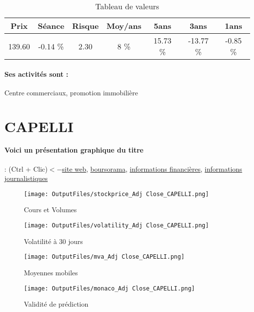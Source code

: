 \documentclass[11pt,a4paper]{report}%
\begin{document}
\begin{table}[H]
  \centering
    \begin{tabular}{|c|c|c|c|c|c|c|}
    \hline
    Prix & Séance & Risque  & Moy/ans & 5ans & 3ans & 1ans \\
    \hline
    139.60 &    -0.14 \%    & 2.30 & 8 \% & 15.73 \% & -13.77 \% & -0.85 \% \\
    \hline
    \end{tabular}%
        \label{tab:table_ALTAREA}%
      \caption{Tableau de valeurs}
\end{table}%

\paragraph{Ses activités sont : } Centre commerciaux, promotion immobilière 
    
    \newpage

\section{CAPELLI}

\paragraph{Voici un présentation graphique du titre} : (Ctrl + Clic)$<-$\href{https://capelli-immobilier.fr/information-financiere}{site web}, \href{https://www.boursorama.com/cours/1rPCAPLI}{boursorama}, \href{https://www.qwant.com/?q=site:https:%2f%2fwww.easybourse.com%2faction-societe%2fCAPELLI&t=web&client=ext-firefox-hp}{informations financières}, \href{https://bourse.lerevenu.com/cours-de-bourse/fiche-valeur-synthese/CAPELLI/CAPLI-FR}{informations journalistiques}
\begin{figure}[!htb]
   \begin{minipage}{0.5\textwidth}
     \centering
     \texttt{[image: OutputFiles/stockprice\_Adj Close\_CAPELLI.png]}
     \caption{Cours et Volumes}\label{Fig:price_CAPELLI}
   \end{minipage}\hfill
   \begin{minipage}{0.5\textwidth}
     \centering
     \texttt{[image: OutputFiles/volatility\_Adj Close\_CAPELLI.png]}
     \caption{Volatilité à 30 jours}\label{Fig:volat_CAPELLI}
   \end{minipage}
\end{figure}
\begin{figure}[!htb]
   \begin{minipage}{0.5\textwidth}
     \centering
     \texttt{[image: OutputFiles/mva\_Adj Close\_CAPELLI.png]}
     \caption{Moyennes mobiles}\label{Fig:mva_CAPELLI}
   \end{minipage}\hfill
   \begin{minipage}{0.5\textwidth}
     \centering
     \texttt{[image: OutputFiles/monaco\_Adj Close\_CAPELLI.png]}
     \caption{Validité de prédiction}\label{Fig:prediction_CAPELLI}
   \end{minipage}
\end{figure}
\end{document}
